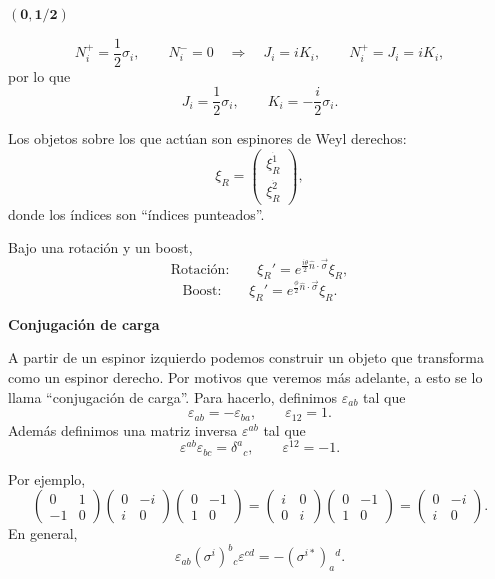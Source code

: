 \documentclass[11pt,a4paper]{article}
\newcommand{\concept}[1]{\textcolor{concept-green}{#1}}
\begin{document}
{\bf $\boldsymbol{(0,1/2)}$}

\[
  N_i^+=\frac12\sigma_i,
  \qquad
  N_i^-=0
  \quad\Longrightarrow\quad
  J_i=iK_i,
  \qquad
  N_i^+=J_i=iK_i,
\]
por lo que
\[
  J_i=\frac12\sigma_i,
  \qquad
  K_i=-\frac{i}{2}\sigma_i.
\]

Los objetos sobre los que actúan son \concept{espinores de Weyl derechos}:
\[
  \xi_R=
  \begin{pmatrix}
    \xi_R^{\dot 1}\\
    \xi_R^{\dot 2}
  \end{pmatrix},
\]
donde los índices son ``índices punteados''.

Bajo una rotación y un boost,
\[
  \text{Rotación:}\qquad
  \xi_R'=e^{\frac{i\theta}{2}\hat n\cdot\vec\sigma}\xi_R,
\]
\[
  \text{Boost:}\qquad
  \xi_R'=e^{\frac{\phi}{2}\hat n\cdot\vec\sigma}\xi_R.
\]

{\bf Conjugación de carga}

A partir de un espinor izquierdo podemos construir un objeto que transforma como un espinor derecho. Por motivos que veremos más adelante, a esto se lo llama ``conjugación de carga''. Para hacerlo, definimos $\varepsilon_{ab}$ tal que
\[
  \varepsilon_{ab}=-\varepsilon_{ba},
  \qquad
  \varepsilon_{12}=1.
\]
Además definimos una matriz inversa $\varepsilon^{ab}$ tal que
\[
  \varepsilon^{ab}\varepsilon_{bc}=\delta^a{}_c,
  \qquad
  \varepsilon^{12}=-1.
\]

Por ejemplo,
\[
  \begin{pmatrix}0&1\\-1&0\end{pmatrix}
  \begin{pmatrix}0&-i\\i&0\end{pmatrix}
  \begin{pmatrix}0&-1\\1&0\end{pmatrix}
  =
  \begin{pmatrix}i&0\\0&i\end{pmatrix}
  \begin{pmatrix}0&-1\\1&0\end{pmatrix}
  =
  \begin{pmatrix}0&-i\\i&0\end{pmatrix}.
\]
En general,
\[
  \varepsilon_{ab}(\sigma^i)^b{}_c\varepsilon^{cd}
  =-(\sigma^{i*})_a{}^d.
\]
\end{document}
